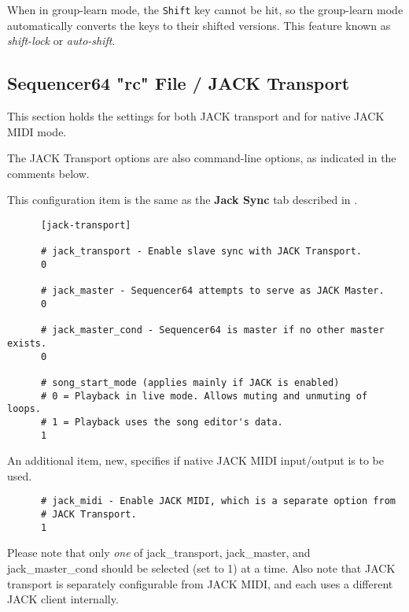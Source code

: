    When in group-learn mode, the \texttt{Shift} key cannot be hit, so the
   group-learn mode automatically converts the keys to their shifted versions.
   This feature known as \textsl{shift-lock} or \textsl{auto-shift}.

\subsection{Sequencer64 "rc" File / JACK Transport}
\label{subsec:seq64_rc_file_jack_transport}

   This section holds the settings for both JACK transport and for native JACK
   MIDI mode.

   The JACK Transport options are also command-line options, as indicated in
   the comments below.

   This configuration item is the same as the 
   \textbf{Jack Sync} tab described in
   .

   \begin{verbatim}
      [jack-transport]

      # jack_transport - Enable slave sync with JACK Transport.
      0

      # jack_master - Sequencer64 attempts to serve as JACK Master.
      0

      # jack_master_cond - Sequencer64 is master if no other master exists.
      0

      # song_start_mode (applies mainly if JACK is enabled)
      # 0 = Playback in live mode. Allows muting and unmuting of loops.
      # 1 = Playback uses the song editor's data.
      1
   \end{verbatim}

   An additional item, new, specifies if native JACK MIDI input/output is to be
   used.

   \begin{verbatim}
      # jack_midi - Enable JACK MIDI, which is a separate option from
      # JACK Transport.
      1
   \end{verbatim}

   Please note that only \textsl{one} of
   jack\_transport, jack\_master, and jack\_master\_cond should be selected
   (set to 1) at a time.
   Also note that JACK transport is separately configurable from
   JACK MIDI, and each uses a different JACK client internally.

